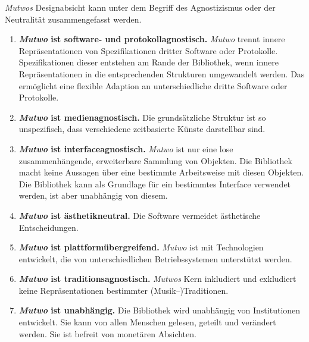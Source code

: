 \documentclass[12pt,a4paper,ngerman]{article}
\begin{document}
\bigskip

\emph{Mutwos} Designabsicht kann unter dem Begriff des Agnostizismus oder der Neutralität zusammengefasst werden.

\begin{enumerate}

    \item{
            \textbf{ \emph{Mutwo} ist software- und protokollagnostisch. }
            \emph{Mutwo} trennt innere Repräsentationen von Spezifikationen dritter Software oder Protokolle.
            Spezifikationen dieser entstehen am Rande der Bibliothek, wenn innere Repräsentationen in die entsprechenden Strukturen umgewandelt werden.
            Das ermöglicht eine flexible Adaption an unterschiedliche dritte Software oder Protokolle.
    }

    \item{
            \textbf{ \emph{Mutwo} ist medienagnostisch. }
            Die grundsätzliche Struktur ist so unspezifisch, dass verschiedene zeitbasierte Künste darstellbar sind.
    }

    \item{
            \textbf{ \emph{Mutwo} ist interfaceagnostisch. }
            \emph{Mutwo} ist nur eine lose zusammenhängende, erweiterbare Sammlung von Objekten.
            Die Bibliothek macht keine Aussagen über eine bestimmte Arbeitsweise mit diesen Objekten.
            Die Bibliothek kann als Grundlage für ein bestimmtes Interface verwendet werden, ist aber unabhängig von diesem.
    }

    \item{
            \textbf{ \emph{Mutwo} ist ästhetikneutral. }
            Die Software vermeidet ästhetische Entscheidungen.
    }

    \item{
            \textbf{ \emph{Mutwo} ist plattformübergreifend. }
            \emph{Mutwo} ist mit Technologien entwickelt, die von unterschiedlichen Betriebssystemen unterstützt werden.
    }

    \item{
            \textbf{ \emph{Mutwo} ist traditionsagnostisch. }
            \emph{Mutwos} Kern inkludiert und exkludiert keine Repräsentationen bestimmter (Musik--)Traditionen.
    }

    \item{
            \textbf{ \emph{Mutwo} ist unabhängig. }
            Die Bibliothek wird unabhängig von Institutionen entwickelt.
            Sie kann von allen Menschen gelesen, geteilt und verändert werden.
            Sie ist befreit von monetären Absichten.
    }

\end{enumerate}
\end{document}
